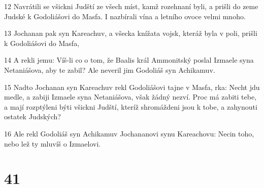 \par 12 Navrátili se všickni Judští ze všech míst, kamž rozehnaní byli, a prišli do zeme Judské k Godoliášovi do Masfa. I nazbírali vína a letního ovoce velmi mnoho.
\par 13 Jochanan pak syn Kareachuv, a všecka knížata vojsk, kteráž byla v poli, prišli k Godoliášovi do Masfa,
\par 14 A rekli jemu: Víš-li co o tom, že Baalis král Ammonitský poslal Izmaele syna Netaniášova, aby te zabil? Ale neveril jim Godoliáš syn Achikamuv.
\par 15 Nadto Jochanan syn Kareachuv rekl Godoliášovi tajne v Masfa, rka: Necht jdu medle, a zabiji Izmaele syna Netaniášova, však žádný nezví. Proc má zabiti tebe, a mají rozptýleni býti všickni Judští, kteríž shromáždeni jsou k tobe, a zahynouti ostatek Judských?
\par 16 Ale rekl Godoliáš syn Achikamuv Jochananovi synu Kareachovu: Necin toho, nebo lež ty mluvíš o Izmaelovi.

\chapter{41}

